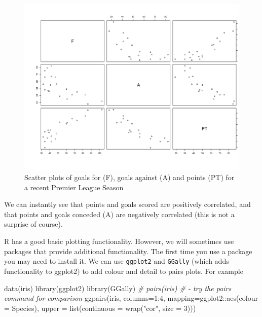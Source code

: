 \documentclass[
]{book}
\newenvironment{Shaded}{\begin{snugshade}}{\end{snugshade}}
\newcommand{\AttributeTok}[1]{\textcolor[rgb]{0.77,0.63,0.00}{#1}}
\newcommand{\CommentTok}[1]{\textcolor[rgb]{0.56,0.35,0.01}{\textit{#1}}}
\newcommand{\DecValTok}[1]{\textcolor[rgb]{0.00,0.00,0.81}{#1}}
\newcommand{\FunctionTok}[1]{\textcolor[rgb]{0.00,0.00,0.00}{#1}}
\newcommand{\NormalTok}[1]{#1}
\newcommand{\SpecialCharTok}[1]{\textcolor[rgb]{0.00,0.00,0.00}{#1}}
\newcommand{\StringTok}[1]{\textcolor[rgb]{0.31,0.60,0.02}{#1}}
\theoremstyle{definition}
\theoremstyle{definition}
\theoremstyle{definition}
\theoremstyle{definition}
\theoremstyle{remark}
\begin{document}
\begin{figure}
\centering
\includegraphics{figs/pairs.png}
\caption{\label{fig:unnamed-chunk-6}Scatter plots of goals for (F), goals against (A) and points (PT) for a recent Premier League Season}
\end{figure}

We can instantly see that points and goals scored are positively correlated, and that points and goals conceded (A) are negatively correlated (this is not a surprise of course).

R has a good basic plotting functionality. However, we will sometimes use packages that provide additional functionality. The first time you use a package you may need to install it. We can use \texttt{ggplot2} and \texttt{GGally} (which adds functionality to ggplot2) to add colour and detail to pairs plots. For example

\begin{Shaded}
\begin{Highlighting}[]
\FunctionTok{data}\NormalTok{(iris)}
\FunctionTok{library}\NormalTok{(ggplot2)}
\FunctionTok{library}\NormalTok{(GGally)}
\CommentTok{\# pairs(iris) \# {-} try the pairs command for comparison}
\FunctionTok{ggpairs}\NormalTok{(iris, }\AttributeTok{columns=}\DecValTok{1}\SpecialCharTok{:}\DecValTok{4}\NormalTok{,  }\AttributeTok{mapping=}\NormalTok{ggplot2}\SpecialCharTok{::}\FunctionTok{aes}\NormalTok{(}\AttributeTok{colour =}\NormalTok{ Species),}
        \AttributeTok{upper =} \FunctionTok{list}\NormalTok{(}\AttributeTok{continuous =} \FunctionTok{wrap}\NormalTok{(}\StringTok{"cor"}\NormalTok{, }\AttributeTok{size =} \DecValTok{3}\NormalTok{)))  }
\end{Highlighting}
\end{Shaded}
\end{document}
